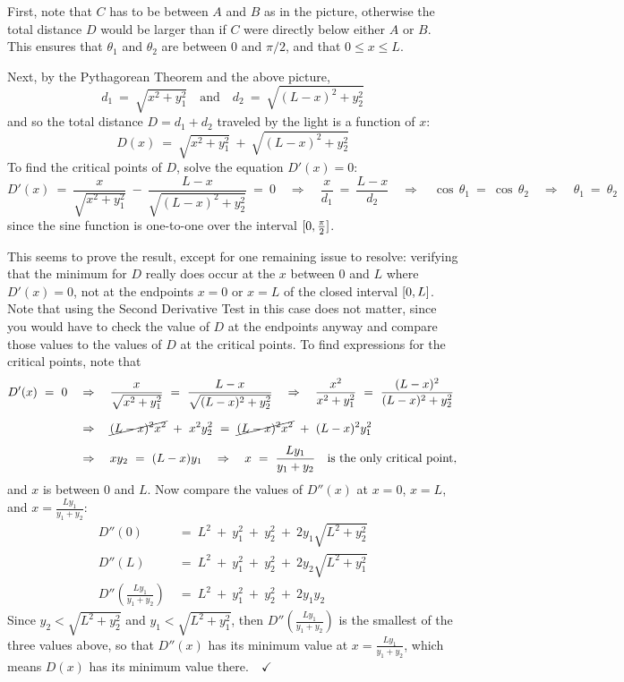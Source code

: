 \begin{exmp}
First, note that $C$ has to be between $A$ and $B$ as in the picture, otherwise
the total distance $D$ would be larger than if $C$ were directly below either
$A$ or $B$. This ensures that $\theta_1$ and $\theta_2$ are between $0$ and
$\pi/2$, and that $0 \le x \le L$.

Next, by the Pythagorean Theorem and the above picture,
\[
d_1 ~=~ \sqrt{x^2 + y_1^2} \quad\text{and}\quad
d_2 ~=~ \sqrt{(L-x)^2 + y_2^2}
\]
and so the total distance $D = d_1 + d_2$ traveled by the light is a function
of $x$:
\[
D(x) ~=~ \sqrt{x^2 + y_1^2} ~+~ \sqrt{(L-x)^2 + y_2^2}
\]
To find the critical points of $D$, solve the equation $D'(x)=0$:
\[
D'(x) ~=~ \frac{x}{\sqrt{x^2 + y_1^2}} ~-~ \frac{L-x}{\sqrt{(L-x)^2 + y_2^2}} ~=~ 0
\quad\Rightarrow\quad \frac{x}{d_1} ~=~ \frac{L-x}{d_2}
\quad\Rightarrow\quad \cos\,\theta_1 ~=~ \cos\,\theta_2
\quad\Rightarrow\quad \theta_1 ~=~ \theta_2
\]
since the sine function is one-to-one over the interval $\lbrack 0,\frac{\pi}{2} \rbrack$.

This seems to prove the result, except for one remaining issue to resolve:
verifying that the minimum for $D$ really does occur at the $x$ between $0$ and
$L$ where $D'(x)=0$, not at the endpoints $x=0$ or $x=L$ of the closed interval
$\lbrack 0,L \rbrack$. Note that using the Second Derivative Test in this case does not
matter, since you would have to check the value of $D$ at the endpoints anyway
and compare those values to the values of $D$ at the critical points. To find
expressions for the critical points, note that
\begin{align*}
D'(x) ~=~ 0 \quad&\Rightarrow\quad
\frac{x}{\sqrt{x^2 + y_1^2}} ~=~ \frac{L-x}{\sqrt{(L-x)^2 + y_2^2}}
\quad\Rightarrow\quad \frac{x^2}{x^2 + y_1^2} ~=~ \frac{(L-x)^2}{(L-x)^2 + y_2^2}\\[6pt]
&\Rightarrow\quad \cancel{(L-x)^2 x^2} ~+~ x^2 y_2^2 ~=~ \cancel{(L-x)^2 x^2} ~+~ (L-x)^2 y_1^2\\[4pt]
&\Rightarrow\quad xy_2 ~=~ (L-x)y_1
\quad\Rightarrow\quad x ~=~ \frac{Ly_1}{y_1 + y_2} \quad\text{is the only critical point,}
\end{align*}
and $x$ is between $0$ and $L$. Now compare the values
of $D''(x)$ at $x=0$, $x=L$, and $x=\frac{Ly_1}{y_1 + y_2}$:
\begin{align*}
D''(0) ~&=~ L^2 ~+~ y_1^2 ~+~ y_2^2 ~+~ 2y_1\sqrt{L^2 + y_2^2}\\
D''(L) ~&=~ L^2 ~+~ y_1^2 ~+~ y_2^2 ~+~ 2y_2\sqrt{L^2 + y_1^2}\\
D''\left(\tfrac{Ly_1}{y_1 + y_2}\right) ~&=~ L^2 ~+~ y_1^2 ~+~ y_2^2 ~+~ 2y_1y_2
\end{align*}
Since $y_2 < \sqrt{L^2 + y_2^2}$ and $y_1 < \sqrt{L^2 + y_1^2}$, then
$D''\left(\tfrac{Ly_1}{y_1 + y_2}\right)$ is the smallest of the three values
above, so that $D''(x)$ has its minimum value at $x=\frac{Ly_1}{y_1 + y_2}$,
which means $D(x)$ has its minimum value there.$\quad\checkmark$
\end{exmp}
